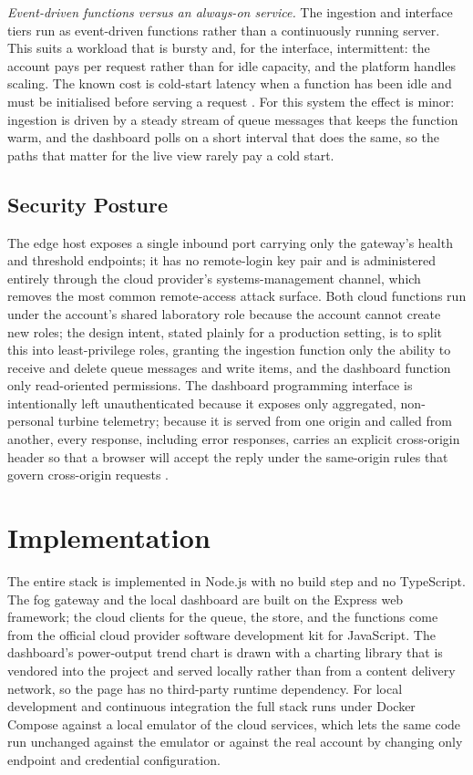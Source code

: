\documentclass[conference]{IEEEtran}
\begin{document}
\textit{Event-driven functions versus an always-on service.} The ingestion and interface tiers run as event-driven functions rather than a continuously running server. This suits a workload that is bursty and, for the interface, intermittent: the account pays per request rather than for idle capacity, and the platform handles scaling. The known cost is cold-start latency when a function has been idle and must be initialised before serving a request \cite{wang2018}. For this system the effect is minor: ingestion is driven by a steady stream of queue messages that keeps the function warm, and the dashboard polls on a short interval that does the same, so the paths that matter for the live view rarely pay a cold start.

\subsection{Security Posture}

The edge host exposes a single inbound port carrying only the gateway's health and threshold endpoints; it has no remote-login key pair and is administered entirely through the cloud provider's systems-management channel, which removes the most common remote-access attack surface. Both cloud functions run under the account's shared laboratory role because the account cannot create new roles; the design intent, stated plainly for a production setting, is to split this into least-privilege roles, granting the ingestion function only the ability to receive and delete queue messages and write items, and the dashboard function only read-oriented permissions. The dashboard programming interface is intentionally left unauthenticated because it exposes only aggregated, non-personal turbine telemetry; because it is served from one origin and called from another, every response, including error responses, carries an explicit cross-origin header so that a browser will accept the reply under the same-origin rules that govern cross-origin requests \cite{barth2011}.

\section{Implementation}

The entire stack is implemented in Node.js with no build step and no TypeScript. The fog gateway and the local dashboard are built on the Express web framework; the cloud clients for the queue, the store, and the functions come from the official cloud provider software development kit for JavaScript. The dashboard's power-output trend chart is drawn with a charting library that is vendored into the project and served locally rather than from a content delivery network, so the page has no third-party runtime dependency. For local development and continuous integration the full stack runs under Docker Compose against a local emulator of the cloud services, which lets the same code run unchanged against the emulator or against the real account by changing only endpoint and credential configuration.
\end{document}
